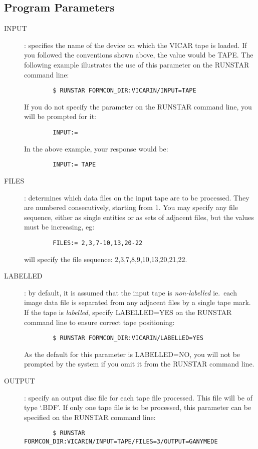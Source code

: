 \subsection {Program Parameters}
\begin{description}
\item[INPUT]:
specifies the name of the device on which the VICAR  tape is loaded.
If you followed the conventions shown above, the value would be TAPE.
The following example illustrates the use of this parameter on the RUNSTAR
command line:
\begin{verbatim}
        $ RUNSTAR FORMCON_DIR:VICARIN/INPUT=TAPE
\end{verbatim}
If you do not specify the parameter on the RUNSTAR command line, you will be
prompted for it:
\begin{verbatim}
        INPUT:=
\end{verbatim}
In the above example, your response would be:
\begin{verbatim}
        INPUT:= TAPE
\end{verbatim}
\item[FILES]:
determines which data files on the input tape are to be processed.
They are numbered consecutively, starting from 1.
You may specify any file sequence, either as single entities or as sets of
adjacent files, but the values must be increasing, eg:
\begin{verbatim}
        FILES:= 2,3,7-10,13,20-22
\end{verbatim}
will specify the file sequence: 2,3,7,8,9,10,13,20,21,22.
\item[LABELLED]:
by default, it is assumed that the input tape is {\em non-labelled} ie.\ each
image data file is separated from any adjacent files by a single tape mark.
If the tape is {\em labelled}, specify LABELLED=YES on the RUNSTAR command line
to ensure correct tape positioning:
\begin{verbatim}
        $ RUNSTAR FORMCON_DIR:VICARIN/LABELLED=YES
\end{verbatim}
As the default for this parameter is LABELLED=NO, you will not be prompted by
the system if you omit it from the RUNSTAR command line.
\item[OUTPUT]:
specify an output disc file for each tape file processed.
This file will be of type `.BDF'.
If only one tape file is to be processed, this parameter can be specified on the
RUNSTAR command line:
\begin{verbatim}
        $ RUNSTAR  FORMCON_DIR:VICARIN/INPUT=TAPE/FILES=3/OUTPUT=GANYMEDE

\end{verbatim}
\end{description}
